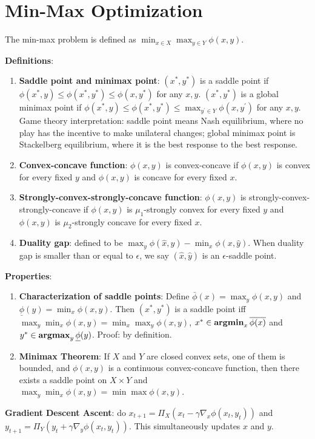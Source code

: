 \section{Min-Max Optimization}

The min-max problem is defined as $\min_{x\in X} \max_{y \in Y} \phi(x,y)$.

\textbf{Definitions}:
\begin{enumerate}
    \item \textbf{Saddle point and minimax point}: $(x^*, y^*)$ is a saddle point if $\phi(x^*, y) \le \phi(x^*, y^*) \le \phi(x, y^*)$ for any $x, y$. $(x^*, y^*)$ is a global minimax point if $\phi(x^*, y) \le \phi(x^*, y^*) \le \max_{y^\prime \in Y} \phi(x, y^\prime)$ for any $x, y$. Game theory interpretation: saddle point means Nash equilibrium, where no play has the incentive to make unilateral changes; global minimax point is Stackelberg equilibrium, where it is the best response to the best response.
    \item \textbf{Convex-concave function}: $\phi(x, y)$ is convex-concave if $\phi(x, y)$ is convex for every fixed $y$ and $\phi(x,y)$ is concave for every fixed $x$.
    \item \textbf{Strongly-convex-strongly-concave function}: $\phi(x, y)$ is strongly-convex-strongly-concave if $\phi(x, y)$ is $\mu_1$-strongly convex for every fixed $y$ and $\phi(x,y)$ is $\mu_2$-strongly concave for every fixed $x$.
    \item \textbf{Duality gap}: defined to be $\max_y \phi(\hat{x}, y) - \min_x \phi(x, \hat{y})$. When duality gap is smaller than or equal to $\epsilon$, we say $(\hat{x}, \hat{y})$ is an $\epsilon$-saddle point.
\end{enumerate}

\textbf{Properties}:
\begin{enumerate}
    \item \textbf{Characterization of saddle points}: Define $\bar{\phi}(x) = \max_y \phi(x,y)$ and $\underline{\phi}(y) = \min_x \phi(x,y)$. Then $(x^*, y^*)$ is a saddle point iff $\max_y \min_x \phi(x,y) = \min_x \max_y \phi(x,y)$, $x^* \in \operatorname{\textbf{argmin}}_x \overline{\phi(x)}$ and $y^* \in \operatorname{\textbf{argmax}}_y \underline{\phi}(y)$. Proof: by definition.
    \item \textbf{Minimax Theorem}: If $X$ and $Y$ are closed convex sets, one of them is bounded, and $\phi(x,y)$ is a continuous convex-concave function, then there exists a saddle point on $X \times Y$ and $\max_y \min_x \phi(x, y) = \min \max \phi(x, y)$.
\end{enumerate}

\textbf{Gradient Descent Ascent}: do $x_{t+1} = \Pi_X(x_t - \gamma \nabla_x \phi(x_t, y_t))$ and $y_{t+1} = \Pi_Y (y_t + \gamma \nabla_y \phi(x_t, y_t))$. This simultaneously updates $x$ and $y$.